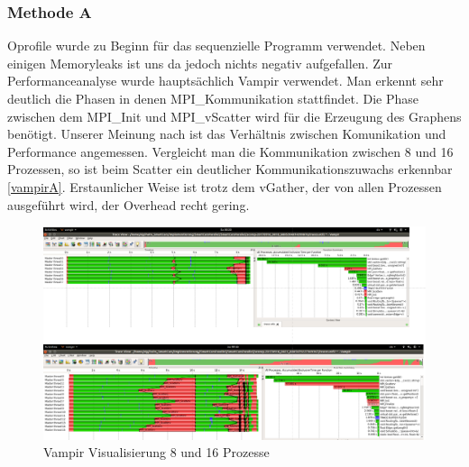 \documentclass[paper=A4,pagesize=auto,12pt,headinclude=true,footinclude=true,BCOR=0mm,DIV=calc]{scrartcl}
\begin{document}
	\subsubsection{Methode A}
	Oprofile wurde zu Beginn für das sequenzielle Programm verwendet. Neben einigen Memoryleaks ist uns da jedoch nichts negativ aufgefallen. Zur Performanceanalyse wurde hauptsächlich Vampir verwendet.  Man erkennt sehr deutlich die Phasen in denen MPI\_Kommunikation stattfindet. Die Phase zwischen dem MPI\_Init und MPI\_vScatter wird für die Erzeugung des Graphens benötigt. Unserer Meinung nach ist das Verhältnis zwischen Komunikation und Performance angemessen. Vergleicht man die Kommunikation zwischen 8 und 16 Prozessen, so ist beim Scatter ein deutlicher Kommunikationszuwachs erkennbar \ref{vampirA}. Erstaunlicher Weise ist trotz dem vGather, der von allen Prozessen ausgeführt wird, der Overhead recht gering.\\
	\label{vampirA}
	\begin{figure}[H]
		\includegraphics[scale = 0.40]{Prasentation/vampirmethodA.png}
		\caption{Vampir Visualisierung 8 und 16 Prozesse}
	\end{figure}
		
\end{document}
